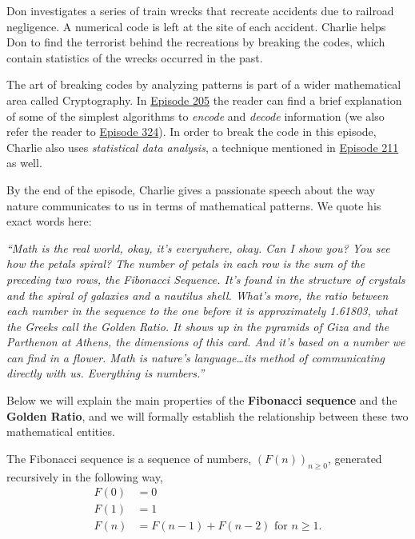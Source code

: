 \newpage
{}
{}


Don investigates a series of train wrecks that recreate accidents due to railroad negligence. A numerical code is left at the site of each accident. Charlie helps Don to find the terrorist behind the recreations by breaking the codes, which contain statistics of the wrecks occurred in the past.


The art of breaking codes by analyzing patterns is part of a wider mathematical area called Cryptography. In \hyperref[ep205]{Episode 205} the reader can find a brief explanation of some of the simplest algorithms to \emph{encode} and \emph{decode} information (we also refer the reader to \hyperref[ep324]{Episode 324}). In order to break the code in this episode, Charlie also uses \emph{statistical data analysis}, a technique mentioned in \hyperref[ep211]{Episode 211} as well.


By the end of the episode, Charlie gives a passionate speech about the way nature communicates to us in terms of mathematical patterns. We quote his exact words here: 
	\begin{center}
	\begin{minipage}{0.75\textwidth}
	\emph{``Math is the real world, okay, it's everywhere, okay. Can I show you? You see how the petals spiral? The number of petals in each row is the sum of the preceding two rows, the Fibonacci Sequence. It's found in the structure of crystals and the spiral of galaxies and a nautilus shell. What's more, the ratio between each number in the sequence to the one before it is approximately 1.61803, what the Greeks call the Golden Ratio. It shows up in the pyramids of Giza and the Parthenon at Athens, the dimensions of this card. And it's based on a number we can find in a flower. Math is nature's language\dots its method of communicating directly with us. Everything is numbers.''}
	\end{minipage}
	\end{center}


Below we will explain the main properties of the \textbf{Fibonacci sequence} and the \textbf{Golden Ratio}, and we will formally establish the relationship between these two mathematical entities.




\textcolor{CornellRed}{The Fibonacci sequence} is a sequence of numbers, $(F(n))_{n \geq 0}$, generated recursively in the following way,
	\[
	\begin{split}
	F(0)&= 0 \\
	F(1)&= 1 \\
	F(n)&= F(n-1) + F(n-2) \text{ for } n \geq 1.
	\end{split}
	\]


